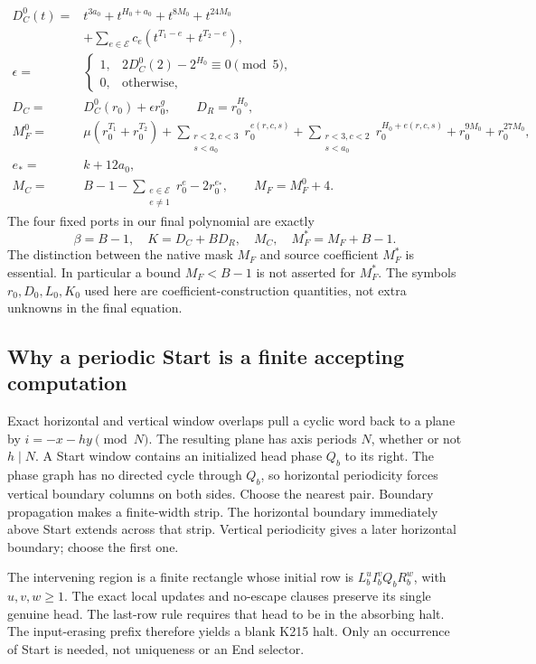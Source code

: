 \documentclass[11pt]{article}
\begin{document}
\begin{align*}
 D_C^0(t)={}&t^{3a_0}+t^{H_0+a_0}+t^{8M_0}+t^{24M_0}\\
 &+\sum_{e\in\mathcal E}c_e(t^{T_1-e}+t^{T_2-e}),\\
 \epsilon={}&\begin{cases}1,&2D_C^0(2)-2^{H_0}\equiv0\pmod5,\\0,&\text{otherwise},\end{cases}\\
 D_C={}&D_C^0(r_0)+\epsilon r_0^g,\qquad D_R=r_0^{H_0},\\
 M_F^0={}&\mu(r_0^{T_1}+r_0^{T_2})
 +\sum_{\substack{r<2,c<3\\s<a_0}}r_0^{e(r,c,s)}
 +\sum_{\substack{r<3,c<2\\s<a_0}}r_0^{H_0+e(r,c,s)}
 +r_0^{9M_0}+r_0^{27M_0},\\
 e_*={}&k+12a_0,\\
 M_C={}&B-1-\sum_{\substack{e\in\mathcal E\\e\ne1}}r_0^e-2r_0^{e_*},
 \qquad M_F=M_F^0+4.
\end{align*}
The four fixed ports in our final polynomial are exactly
\begin{equation}\label{eq:constants}
 \boxed{\quad
 \beta=B-1,\quad K=D_C+BD_R,\quad M_C,\quad M_F^*=M_F+B-1.\quad}
\end{equation}
The distinction between the native mask \(M_F\) and source coefficient \(M_F^*\) is essential. In particular a bound \(M_F<B-1\) is not asserted for \(M_F^*\). The symbols \(r_0,D_0,L_0,K_0\) used here are coefficient-construction quantities, not extra unknowns in the final equation.

\subsection{Why a periodic Start is a finite accepting computation}
Exact horizontal and vertical window overlaps pull a cyclic word back to a plane by \(i=-x-hy\pmod N\). The resulting plane has axis periods \(N\), whether or not \(h\mid N\). A Start window contains an initialized head phase \(Q_b\) to its right. The phase graph has no directed cycle through \(Q_b\), so horizontal periodicity forces vertical boundary columns on both sides. Choose the nearest pair. Boundary propagation makes a finite-width strip. The horizontal boundary immediately above Start extends across that strip. Vertical periodicity gives a later horizontal boundary; choose the first one.

The intervening region is a finite rectangle whose initial row is
\(L_b^uI_b^vQ_bR_b^w\), with \(u,v,w\ge1\). The exact local updates and no-escape clauses preserve its single genuine head. The last-row rule requires that head to be in the absorbing halt. The input-erasing prefix therefore yields a blank K215 halt. Only an occurrence of Start is needed, not uniqueness or an End selector.
\end{document}
